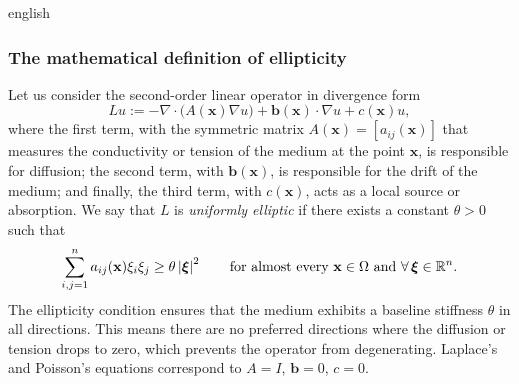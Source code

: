 \documentclass[0000.tex]{subfiles}
\begin{document}
\begin{hyphenrules}{english}
\subsubsection{The mathematical definition of ellipticity}
Let us consider the second-order linear operator in divergence form
\begin{equation}
  Lu:=-\nabla\cdot\big(A(\mathbf{x})\nabla u\big)+\mathbf{b}(\mathbf{x})\cdot\nabla u+c(\mathbf{x})u,
  \label{eq:elliptic-op}
\end{equation}
where the first term, with the symmetric matrix $A(\mathbf{x})=[a_{ij}(\mathbf{x})]$ that measures the conductivity or
tension of the medium at the point $\mathbf{x}$, is responsible for diffusion; the second term,
with $\mathbf{b}(\mathbf{x})$, is responsible for the drift of the medium; and finally, the third term, with $c(\mathbf{x})$,
acts as a local source or absorption. We say that $L$ is \emph{uniformly elliptic} if there exists a
constant $\theta>0$ such that
\begin{equation}
  \sum_{i,j=1}^{n}a_{ij}(\mathbf{x})\xi_i\xi_j\ge\theta\left\lvert \bm\xi \right\rvert^2\qquad
  \text{for almost every }\mathbf{x}\in\Omega\text{ and }\forall\,\bm\xi\in\mathbb{R}^n.
  \label{eq:uniform-ellipticity}
\end{equation}
The ellipticity condition ensures that the medium exhibits a baseline stiffness $\theta$ in all
directions. This means there are no preferred directions where the diffusion or tension drops to zero,
which prevents the operator from degenerating. Laplace's and Poisson's equations correspond to $A=I$,
$\mathbf{b}=0$, $c=0$.


\end{hyphenrules}
\end{document}
